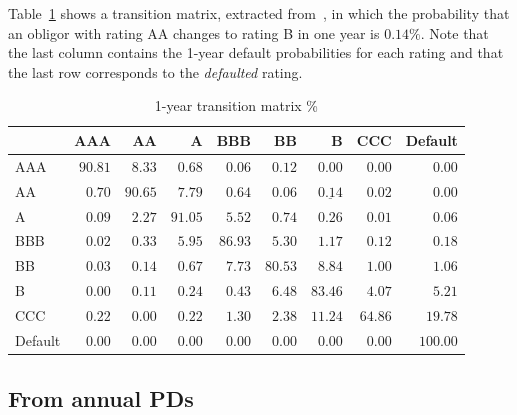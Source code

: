 \documentclass[11pt,fleqn]{book} %
\begin{document}
\begin{example}
	\label{ex:1ytm}
	Table~\ref{tmatrix1} shows a transition matrix, extracted 
	from~\cite[p. 20]{cmetrics:1997}, in which the probability that an obligor 
	with rating AA changes to rating B in one year is $0.14\%$. Note that the
	last column contains the 1-year default probabilities for each rating and 
	that the last row corresponds to the \emph{defaulted} rating.
	\begin{table}[!ht]
		\begin{center}
			\begin{tabular}[]{l|rrrrrrrr}
				        & AAA     & AA      & A       & BBB     & BB      & B                  & CCC     & Default  \\
				\hline
				AAA     & $90.81$ & $8.33$  & $0.68$  & $0.06$  & $0.12$  & $0.00$             & $0.00$  & $0.00$   \\
				AA      & $0.70$  & $90.65$ & $7.79$  & $0.64$  & $0.06$  & $\underline{0.14}$ & $0.02$  & $0.00$   \\
				A       & $0.09$  & $2.27$  & $91.05$ & $5.52$  & $0.74$  & $0.26$             & $0.01$  & $0.06$   \\
				BBB     & $0.02$  & $0.33$  & $5.95$  & $86.93$ & $5.30$  & $1.17$             & $0.12$  & $0.18$   \\
				BB      & $0.03$  & $0.14$  & $0.67$  & $7.73$  & $80.53$ & $8.84$             & $1.00$  & $1.06$   \\
				B       & $0.00$  & $0.11$  & $0.24$  & $0.43$  & $6.48$  & $83.46$            & $4.07$  & $5.21$   \\
				CCC     & $0.22$  & $0.00$  & $0.22$  & $1.30$  & $2.38$  & $11.24$            & $64.86$ & $19.78$  \\
				Default & $0.00$  & $0.00$  & $0.00$  & $0.00$  & $0.00$  & $0.00$             & $0.00$  & $100.00$ \\
			\end{tabular}
			\caption{1-year transition matrix \%}
			\label{tmatrix1}
		\end{center}
	\end{table}
\end{example}

\subsection{From annual PDs}
\label{pdfsv}
\end{document}
